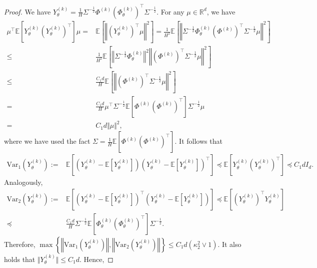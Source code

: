 \documentclass{article}
\numberwithin{equation}{section}
\begin{document}
\begin{proof}
We have $Y^{(k)}_\theta=\frac{1}{H}\Sigma^{-\frac{1}{2}}\Phi^{(k)}\left(\Phi^{(k)}_\theta\right)^\top\Sigma^{-\frac{1}{2}}$. For any $\mu\in\mathbb{R}^d$, we have
\begin{align*}
    \mu^\top\mathbb{E}\left[Y_\theta^{(k)}\left(Y_\theta^{(k)}\right)^\top\right]\mu=&\mathbb{E}\left[\left\Vert\left(Y_\theta^{(k)}\right)^\top\mu\right\Vert^2\right]=\frac{1}{H^2}\mathbb{E}\left[\left\Vert\Sigma^{-\frac{1}{2}}\Phi_\theta^{(k)}\left(\Phi^{(k)}\right)^\top\Sigma^{-\frac{1}{2}}\mu\right\Vert^2\right]\\
    \leq&\frac{1}{H^2}\mathbb{E}\left[\left\Vert\Sigma^{-\frac{1}{2}}\Phi_\theta^{(k)}\right\Vert^2\left\Vert\left(\Phi^{(k)}\right)^\top\Sigma^{-\frac{1}{2}}\mu\right\Vert^2\right]\\
    \leq&\frac{C_1d}{H}\mathbb{E}\left[\left\Vert\left(\Phi^{(k)}\right)^\top\Sigma^{-\frac{1}{2}}\mu\right\Vert^2\right]\\
    =&\frac{C_1d}{H}\mu^\top\Sigma^{-\frac{1}{2}}\mathbb{E}\left[\Phi^{(k)}\left(\Phi^{(k)}\right)^\top\right]\Sigma^{-\frac{1}{2}}\mu\\
    =&C_1d\Vert\mu\Vert^2,
\end{align*}
where we have used the fact $\Sigma=\frac{1}{H}\mathbb{E}\left[\Phi^{(k)}\left(\Phi^{(k)}\right)^\top\right]$. It follows that
\begin{align*} 
    \textrm{Var}_1\left(Y_\theta^{(k)}\right):=&\mathbb{E}\left[\left(Y_\theta^{(k)}-\mathbb{E}\left[Y_\theta^{(k)}\right]\right)\left(Y_\theta^{(k)}-\mathbb{E}\left[Y_\theta^{(k)}\right]\right)^\top\right]\preceq\mathbb{E}\left[Y_\theta^{(k)}\left(Y_\theta^{(k)}\right)^\top\right]\preceq C_1dI_d. 
\end{align*} 
Analogously,
\begin{align*} 
	\textrm{Var}_2\left(Y_\theta^{(k)}\right):=&\mathbb{E}\left[\left(Y_\theta^{(k)}-\mathbb{E}\left[Y_\theta^{(k)}\right]\right)^\top\left(Y_\theta^{(k)}-\mathbb{E}\left[Y_\theta^{(k)}\right]\right)\right]\preceq\mathbb{E}\left[\left(Y_\theta^{(k)}\right)^\top Y_\theta^{(k)}\right]\\
	\preceq& \frac{C_1d}{H}\Sigma^{-\frac{1}{2}}\mathbb{E}\left[\Phi^{(k)}_\theta\left(\Phi^{(k)}_\theta\right)^\top\right]\Sigma^{-\frac{1}{2}}. 
\end{align*}
Therefore, $\max\left\{\left\Vert\textrm{Var}_1\left(Y_\theta^{(k)}\right)\right\Vert, \left\Vert\textrm{Var}_2\left(Y_\theta^{(k)}\right)\right\Vert\right\}\leq C_1d\left(\kappa_2^2\vee 1\right)$. It also holds that $\Vert Y_\theta^{(k)}\Vert\leq C_1d$. Hence,

\end{proof}
\end{document}
